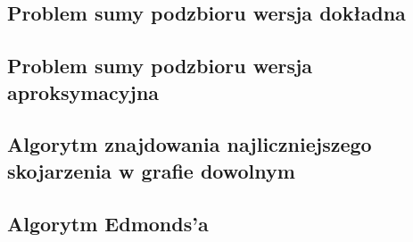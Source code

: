 \documentclass[11pt,a4paper]{article}
\begin{document}
\subsection{Problem sumy podzbioru wersja dokładna}


\subsection{Problem sumy podzbioru wersja aproksymacyjna}


\subsection{Algorytm znajdowania najliczniejszego skojarzenia w grafie dowolnym}


\subsection{Algorytm Edmonds'a}

\end{document}
